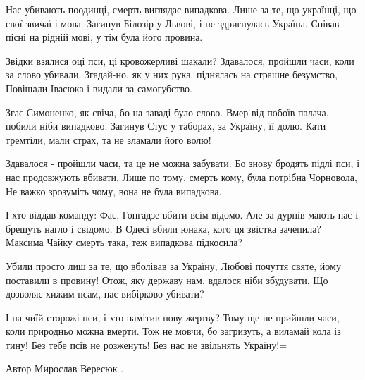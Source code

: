 \begin{multicols}{2}
	\obeycr
Нас убивають поодинці, смерть виглядає випадкова.
Лише за те, що українці, що свої звичаї і мова.
Загинув Білозір у Львові, і не здригнулась Україна.
Співав пісні на рідній мові, у тім була його провина.

Звідки взялися оці пси, ці кровожерливі шакали?
Здавалося, пройшли часи, коли за слово убивали.
Згадай-но, як у них рука, піднялась на страшне безумство,
Повішали Івасюка і видали за самогубство.

Згас Симоненко, як свіча, бо на заваді було слово.
Вмер від побоїв палача, побили ніби випадково.
Загинув Стус у таборах, за Україну, її долю.
Кати тремтіли, мали страх, та не зламали його волю!

Здавалося - пройшли часи, та це не можна забувати.
Бо знову бродять підлі пси, і нас продовжують вбивати.
Лише по тому, смерть кому, була потрібна Чорновола,
Не важко зрозуміть чому, вона не була випадкова.

І хто віддав команду: Фас, Гонгадзе вбити всім відомо.
Але за дурнів мають нас і брешуть нагло і свідомо.
В Одесі вбили юнака, кого ця звістка зачепила?
Максима Чайку смерть така, теж випадкова підкосила?

Убили просто лиш за те, що вболівав за Україну,
Любові почуття святе, йому поставили в провину!
Отож, яку державу нам, вдалося ніби збудувати,
Що дозволяє хижим псам, нас вибірково убивати?

І на чиїй сторожі пси, і хто намітив нову жертву?
Тому ще не прийшли часи, коли природньо можна вмерти.
Тож не мовчи, бо загризуть, а виламай кола із тину!
Без тебе псів не розженуть! Без нас не звільнять Україну!=

Автор Мирослав Вересюк .
	\restorecr
\end{multicols}
